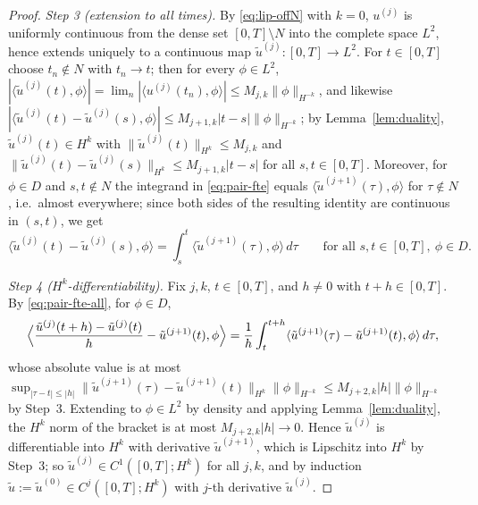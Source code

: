 \documentclass[11pt]{article}
\theoremstyle{definition}
\theoremstyle{plain}
\newcommand{\norm}[1]{\lVert #1\rVert}
\begin{document}
\begin{proof}
\emph{Step 3 (extension to all times).}  By \eqref{eq:lip-offN} with $k=0$,
$u^{(j)}$ is uniformly continuous from the dense set $[0,T]\setminus N$
into the complete space $L^2$, hence extends uniquely to a continuous map
$\tilde u^{(j)}:[0,T]\to L^2$.  For $t\in[0,T]$ choose $t_n\notin N$ with
$t_n\to t$; then for every $\phi\in L^2$, $|\langle\tilde u^{(j)}(t),\phi
\rangle|=\lim_n|\langle u^{(j)}(t_n),\phi\rangle|\leq M_{j,k}
\norm\phi_{H^{-k}}$, and likewise $|\langle\tilde u^{(j)}(t)-\tilde
u^{(j)}(s),\phi\rangle|\leq M_{j+1,k}|t-s|\norm\phi_{H^{-k}}$; by
Lemma~\ref{lem:duality}, $\tilde u^{(j)}(t)\in H^k$ with
$\norm{\tilde u^{(j)}(t)}_{H^k}\leq M_{j,k}$ and
$\norm{\tilde u^{(j)}(t)-\tilde u^{(j)}(s)}_{H^k}\leq M_{j+1,k}|t-s|$ for
all $s,t\in[0,T]$.  Moreover, for $\phi\in D$ and $s,t\notin N$ the
integrand in \eqref{eq:pair-fte} equals $\langle\tilde u^{(j+1)}(\tau),
\phi\rangle$ for $\tau\notin N$, i.e.\ almost everywhere; since both sides
of the resulting identity are continuous in $(s,t)$, we get
\begin{equation}\label{eq:pair-fte-all}
 \langle\tilde u^{(j)}(t)-\tilde u^{(j)}(s),\phi\rangle
 =\int_s^t\langle\tilde u^{(j+1)}(\tau),\phi\rangle\,d\tau
 \qquad\text{for all }s,t\in[0,T],\ \phi\in D .
\end{equation}

\emph{Step 4 ($H^k$-differentiability).}  Fix $j,k$, $t\in[0,T]$, and
$h\neq0$ with $t+h\in[0,T]$.  By \eqref{eq:pair-fte-all}, for $\phi\in D$,
\[
 \Bigl\langle\frac{\tilde u^{(j)}(t+h)-\tilde u^{(j)}(t)}{h}
 -\tilde u^{(j+1)}(t),\phi\Bigr\rangle
 =\frac1h\int_t^{t+h}\langle\tilde u^{(j+1)}(\tau)-\tilde u^{(j+1)}(t),
 \phi\rangle\,d\tau ,
\]
whose absolute value is at most $\sup_{|\tau-t|\leq|h|}\norm{\tilde
u^{(j+1)}(\tau)-\tilde u^{(j+1)}(t)}_{H^k}\norm\phi_{H^{-k}}\leq
M_{j+2,k}|h|\norm\phi_{H^{-k}}$ by Step~3.  Extending to $\phi\in L^2$ by
density and applying Lemma~\ref{lem:duality}, the $H^k$ norm of the
bracket is at most $M_{j+2,k}|h|\to0$.  Hence $\tilde u^{(j)}$ is
differentiable into $H^k$ with derivative $\tilde u^{(j+1)}$, which is
Lipschitz into $H^k$ by Step~3; so $\tilde u^{(j)}\in C^1([0,T];H^k)$ for
all $j,k$, and by induction $\tilde u:=\tilde u^{(0)}\in C^j([0,T];H^k)$
with $j$-th derivative $\tilde u^{(j)}$.


\end{proof}
\end{document}
